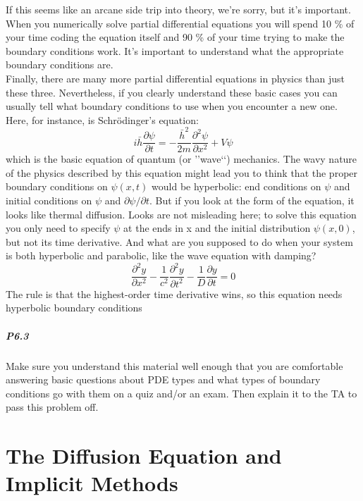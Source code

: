 \documentclass{book}
\theoremstyle{plain}
\theoremstyle{definition}
\numberwithin{exm}{chapter}
\theoremstyle{remark}
\theoremstyle{summary}
\theoremstyle{overview}
\begin{document}
If this seems like an arcane side trip into theory, we\rq re sorry, but it\rq s important.
When you numerically solve partial differential equations you will spend 10 \%
of your time coding the equation itself and 90 \% of your time trying to make the
boundary conditions work. It\rq s important to understand what the appropriate
boundary conditions are. \\
Finally, there are many more partial differential equations in physics than
just these three. Nevertheless, if you clearly understand these basic cases you
can usually tell what boundary conditions to use when you encounter a new one.
Here, for instance, is Schr{\"o}dinger\rq s equation:
\begin{equation}\label{eq:615}
i \bar{h} \frac{\partial \psi}{\partial t}=-\frac{\bar{h}^{2}}{2 m} \frac{\partial^{2} \psi}{\partial x^{2}} + V \psi
\end{equation}
which is the basic equation of quantum (or \rq\rq wave\lq\lq) mechanics. The wavy nature
of the physics described by this equation might lead you to think that the proper
boundary conditions on $\psi (x,t)$ would be hyperbolic: end conditions on $\psi$ and initial conditions on $\psi$ and $\partial \psi / \partial t$. But if you look at the form of the equation, it
looks like thermal diffusion. Looks are not misleading here; to solve this equation
you only need to specify $\psi$ at the ends in x and the initial distribution $ \psi(x,0)$, but
not its time derivative. And what are you supposed to do when your system is both hyperbolic and
parabolic, like the wave equation with damping?
\begin{equation}\label{eq:616}
\frac{\partial^{2} y}{\partial x^{2}}-\frac{1}{c^{2}} \frac{\partial^{2} y}{\partial t^{2}}-\frac{1}{D} \frac{\partial y}{\partial t}=0
\end{equation}
The rule is that the highest-order time derivative wins, so this equation needs
hyperbolic boundary conditions
\paragraph*{P6.3} Make sure you understand this material well enough that you are comfortable answering basic questions about PDE types and what types of
boundary conditions go with them on a quiz and/or an exam. Then explain
it to the TA to pass this problem off.


\chapter*{The Diffusion Equation and Implicit Methods}
\end{document}
